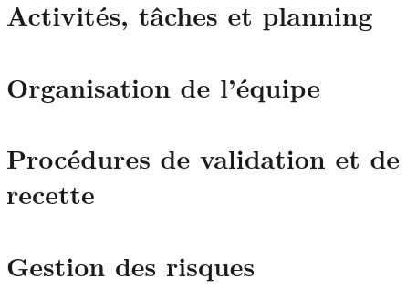 \part{Activités, tâches et planning}
\setcounter{section}{0}

\part{Organisation de l'équipe}
\setcounter{section}{0}

\part{Procédures de validation et de recette}
\setcounter{section}{0}

\part{Gestion des risques}
\setcounter{section}{0}



